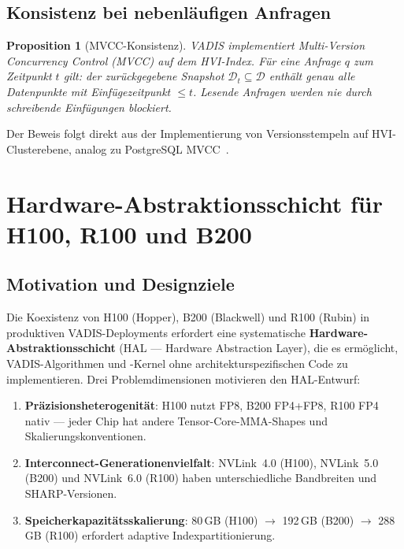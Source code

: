 ﻿\documentclass[12pt,a4paper]{article}
\newtheorem{proposition}[theorem]{Proposition}
\begin{document}
\subsection{Konsistenz bei nebenläufigen Anfragen}

\begin{proposition}[MVCC-Konsistenz]
\label{prop:mvcc}
VADIS implementiert \emph{Multi-Version Concurrency Control} (MVCC)
auf dem HVI-Index. Für eine Anfrage $q$ zum Zeitpunkt $t$ gilt:
der zurückgegebene Snapshot $\mathcal{D}_t \subseteq \mathcal{D}$
enthält genau alle Datenpunkte mit Einfügezeitpunkt $\leq t$.
Lesende Anfragen werden nie durch schreibende Einfügungen blockiert.
\end{proposition}

Der Beweis folgt direkt aus der Implementierung von Versionsstempeln
auf HVI-Clusterebene, analog zu PostgreSQL MVCC~\cite{momjian2001postgresql}.

\section{Hardware-Abstraktionsschicht für H100, R100 und B200}
\label{sec:hwabs_nvidia}

\subsection{Motivation und Designziele}
\label{sub:hwabs_motivation}

Die Koexistenz von H100 (Hopper), B200 (Blackwell) und R100 (Rubin)
in produktiven VADIS-Deployments erfordert eine systematische
\textbf{Hardware-Abstraktionsschicht} (HAL --- Hardware
Abstraction Layer), die es ermöglicht, VADIS-Algorithmen
und -Kernel ohne architekturspezifischen Code zu implementieren.
Drei Problemdimensionen motivieren den HAL-Entwurf:

\begin{enumerate}[leftmargin=1.4em, itemsep=2pt, topsep=4pt]
  \item \textbf{Präzisionsheterogenität}: H100 nutzt FP8, B200
        FP4+FP8, R100 FP4 nativ --- jeder Chip hat andere
        Tensor-Core-MMA-Shapes und Skalierungskonventionen.
  \item \textbf{Interconnect-Generationenvielfalt}: NVLink~4.0
        (H100), NVLink~5.0 (B200) und NVLink~6.0 (R100) haben
        unterschiedliche Bandbreiten und SHARP-Versionen.
  \item \textbf{Speicherkapazitätsskalierung}: 80\,GB (H100) $\to$
        192\,GB (B200) $\to$ 288\,GB (R100) erfordert adaptive
        Indexpartitionierung.
\end{enumerate}
\end{document}
